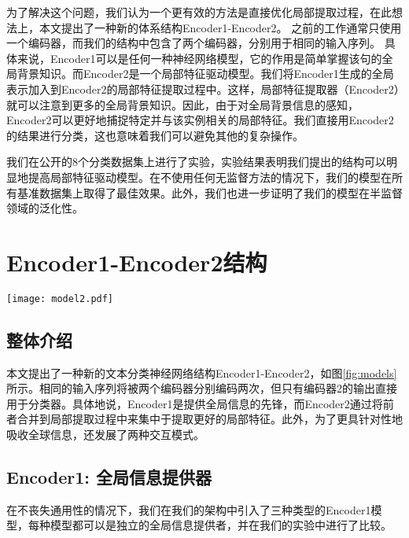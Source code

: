 为了解决这个问题，我们认为一个更有效的方法是直接优化局部提取过程，在此想法上，本文提出了一种新的体系结构Encoder1-Encoder2。
之前的工作通常只使用一个编码器，而我们的结构中包含了两个编码器，分别用于相同的输入序列。
具体来说，Encoder1可以是任何一种神经网络模型，它的作用是简单掌握该句的全局背景知识。而Encoder2是一个局部特征驱动模型。我们将Encoder1生成的全局表示加入到Encoder2的局部特征提取过程中。这样，局部特征提取器（Encoder2）就可以注意到更多的全局背景知识。因此，由于对全局背景信息的感知，Encoder2可以更好地捕捉特定并与该实例相关的局部特征。我们直接用Encoder2的结果进行分类，这也意味着我们可以避免其他的复杂操作。

我们在公开的8个分类数据集上进行了实验，实验结果表明我们提出的结构可以明显地提高局部特征驱动模型。在不使用任何无监督方法的情况下，我们的模型在所有基准数据集上取得了最佳效果。此外，我们也进一步证明了我们的模型在半监督领域的泛化性。


\section{Encoder1-Encoder2结构}
\begin{figure*}[ht]
\center
     \texttt{[image: model2.pdf]}
     \caption{Encoder1-Encoder2结构由三部分组成。 (1) Encoder1是全局信息提供器。 (2) Encoder2是局部特征抽取器，它的结果直接用于分类。(3) Mode是二者的交互模式，其中``S''和``A''分别是``SAME''模式 and ``ATTEND''模式的缩写。}
     \label{fig:models}
\end{figure*}

\subsection{整体介绍}

本文提出了一种新的文本分类神经网络结构Encoder1-Encoder2，如图\ref{fig:models}所示。相同的输入序列将被两个编码器分别编码两次，但只有编码器2的输出直接用于分类器。具体地说，Encoder1是提供全局信息的先锋，而Encoder2通过将前者合并到局部提取过程中来集中于提取更好的局部特征。此外，为了更具针对性地吸收全球信息，还发展了两种交互模式。

\subsection{Encoder1: 全局信息提供器}
在不丧失通用性的情况下，我们在我们的架构中引入了三种类型的Encoder1模型，每种模型都可以是独立的全局信息提供者，并在我们的实验中进行了比较。

